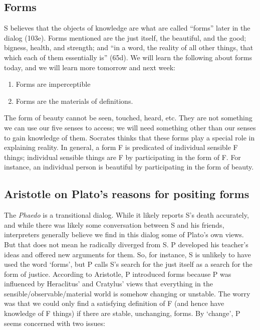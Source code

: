 \documentclass[oneside]{article}
\begin{document}
\subsection*{Forms}
S believes that the objects of knowledge are what are called ``forms'' later in the dialog (103e). Forms  mentioned are the just itself, the beautiful, and the good; bigness, health, and strength; and ``in a word, the reality of all other things, that which each of them essentially is'' (65d). We will learn the following about forms today, and we will learn more tomorrow and next week: 
\begin{enumerate}
\item Forms are imperceptible
\item Forms are the materials of definitions. 
\end{enumerate} 
The form of beauty cannot be seen, touched, heard, etc. They are not something we can use our five senses to access; we will need something other than our senses to gain knowledge of them. Socrates thinks that these forms play a special role in explaining reality. In general, a form F is predicated of individual sensible F things; individual sensible things are F by participating in the form of F. For instance, an individual person is beautiful by participating in the form of beauty. 

\subsection*{Aristotle on Plato's reasons for positing forms}
The \emph{Phaedo} is a transitional dialog. While it likely reports S's death accurately, and while there was likely some conversation between S and his friends, interpreters generally believe we find in this dialog some of Plato's own views. But that does not mean he radically diverged from S. P developed his teacher's ideas and offered new arguments for them. So, for instance, S is unlikely to have used the word `forms', but P calls S's search for the just itself as a search for the form of justice. According to Aristotle, P introduced forms because P was influenced by Heraclitus' and Cratylus' views that everything in the sensible/observable/material world is somehow changing or unstable. The worry was that we could only find a satisfying definition of F (and hence have knowledge of F things) if there are stable, unchanging, forms. By `change', P seems concerned with two issues: 
\end{document}
